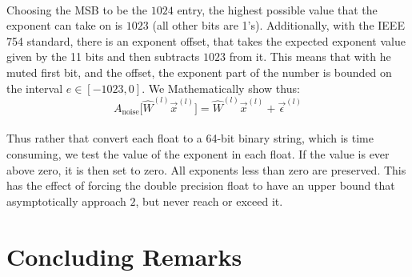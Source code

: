 \documentclass[12pt,letterpaper]{article}
\begin{document}
\paragraph*{}Choosing the MSB to be the $1024$ entry, the highest possible value that the exponent can take on is $1023$ (all other bits are 1's). Additionally, with the IEEE 754 standard, there is an exponent offset, that takes the expected exponent value given by the 11 bits and then subtracts $1023$ from it. This means that with he muted first bit, and the offset, the exponent part of the number is bounded on the interval 
$e \in [-1023,0]$. We Mathematically show thus:
\begin{equation}
\label{mute MSB attack}
A_{\text{noise}} \big[ \hat{W}^{(l)} \vec{x}^{(l)} \big] = \hat{W}^{(l)} \vec{x}^{(l)} + \vec{\epsilon}^{(l)}
\end{equation}

\paragraph*{}Thus rather that convert each float to a 64-bit binary string, which is time consuming, we test the value of the exponent in each float. If the value is ever above zero, it is then set to zero. All exponents less than zero are preserved. This has the effect of forcing the double precision float to have an upper bound that asymptotically approach $2$, but never reach or exceed it.


\section*{Concluding Remarks}


\end{document}
